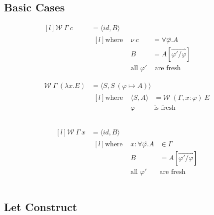 \subsection{Basic Cases}
\begin{minipage}{.5\textwidth}  
\[\begin{matrix*}[l]
    \mathcal{W} \ \Gamma \ c & = \langle id, B \rangle \\
    & \begin{matrix*}[l]
        \text{where } & \nu \ c & = \forall \overset{\rightharpoonup}{\varphi} . A \\
        & B & = A [\overset{\rightharpoonup}{\varphi' / \varphi}] \\
        & \text{all } \varphi' & \text{ are fresh} \\
    \end{matrix*} \\
    \\
    \mathcal{W} \ \Gamma \ (\lambda x . E) & = \langle S , S \ (\varphi \mapsto A) \rangle \\
    & \begin{matrix*}[l]
        \text{where } & \langle S, A \rangle &= \mathcal{W} \ (\Gamma, x:\varphi) \ E \\
        & \varphi & \text{is fresh} \\
    \end{matrix*} \\
\end{matrix*}\]
\end{minipage}
\vline
\begin{minipage}{.5\textwidth}
\[\begin{matrix*}[l]
    \mathcal{W} \ \Gamma \ x & = \langle id, B \rangle \\
    & \begin{matrix*}[l]
        \text{where } & x:\forall \overset{\rightharpoonup}{\varphi} . A & \in \Gamma \\
        & B & = A [\overset{\rightharpoonup}{\varphi' / \varphi}] \\
        & \text{all } \varphi' & \text{are fresh} \\
    \end{matrix*} \\
\end{matrix*}\]
\end{minipage}

\subsection{Let Construct}

